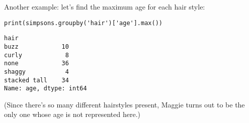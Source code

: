 Another example: let's find the maximum age for each hair style:

\begin{Verbatim}[fontsize=\small,samepage=true,frame=single,framesep=3mm]
print(simpsons.groupby('hair')['age'].max())
\end{Verbatim}
\vspace{-.2in}

\begin{Verbatim}[fontsize=\small,samepage=true,frame=leftline,framesep=5mm,framerule=1mm]
hair
buzz            10
curly            8
none            36
shaggy           4
stacked tall    34
Name: age, dtype: int64
\end{Verbatim}

(Since there's so many different hairstyles present, Maggie turns out to be the
only one whose age is not represented here.)




